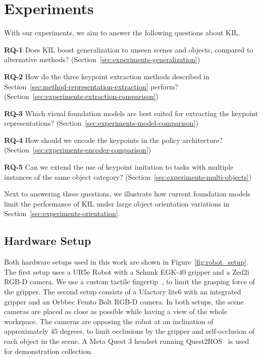 \documentclass[letterpaper, 10 pt, conference]{ieeeconf}  %
\begin{document}
\section{Experiments}
\label{sec:experiments}

With our experiments, we aim to answer the following questions about KIL.

\noindent \textbf{RQ-1} Does KIL boost generalization to unseen scenes and objects, compared to alternative methods? (Section~\ref{sec:experiments-generalization})

\noindent \textbf{RQ-2} How do the three keypoint extraction methods described in Section~\ref{sec:method-representation-extraction} perform? (Section~\ref{sec:experiments-extraction-comparison})

\noindent \textbf{RQ-3} Which visual foundation models are best suited for extracting the keypoint representations? (Section~\ref{sec:experiments-model-comparison})

\noindent \textbf{RQ-4} How should we encode the keypoints in the policy architecture? (Section~\ref{sec:experiments-encoder-comparison})

\noindent \textbf{RQ-5} Can we extend the use of keypoint imitation to tasks with multiple instances of the same object category? (Section~\ref{sec:experiments-multi-objects})


Next to answering these questions, we illustrate how current foundation models limit the performance of KIL under large object orientation variations in Section~\ref{sec:experiments-orientation}.



\subsection{Hardware Setup}
\label{sec:experiments-hardware}
Both hardware setups used in this work are shown in Figure~\ref{fig:robot_setup}.
The first setup uses a UR5e Robot with a Schunk EGK-$40$ gripper and a Zed2i RGB-D camera. We use a custom tactile fingertip~\cite{liu2025magtouch}, to limit the grasping force of the gripper.
The second setup consists of a Ufactory lite6 with an integrated gripper and an Orbbec Femto Bolt RGB-D camera.
In both setups, the scene cameras are placed as close as possible while having a view of the whole workspace. The cameras are opposing the robot at an inclination of approximately $45$ degrees, to limit occlusions by the gripper and self-occlusion of each object in the scene. A Meta Quest $3$ headset running Quest2ROS~\cite{welle2024quest2ros} is used for demonstration collection. %
\end{document}
